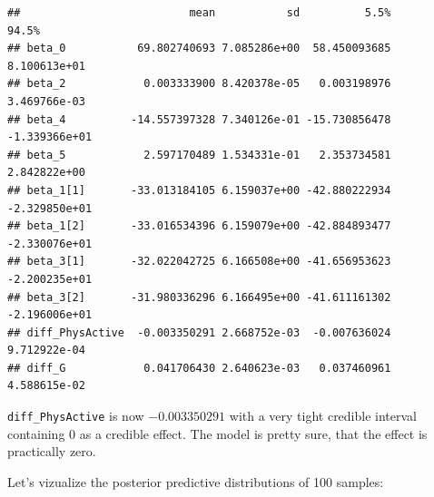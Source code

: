 \documentclass[
]{book}
\begin{document}
\begin{verbatim}
##                          mean           sd          5.5%         94.5%
## beta_0           69.802740693 7.085286e+00  58.450093685  8.100613e+01
## beta_2            0.003333900 8.420378e-05   0.003198976  3.469766e-03
## beta_4          -14.557397328 7.340126e-01 -15.730856478 -1.339366e+01
## beta_5            2.597170489 1.534331e-01   2.353734581  2.842822e+00
## beta_1[1]       -33.013184105 6.159037e+00 -42.880222934 -2.329850e+01
## beta_1[2]       -33.016534396 6.159079e+00 -42.884893477 -2.330076e+01
## beta_3[1]       -32.022042725 6.166508e+00 -41.656953623 -2.200235e+01
## beta_3[2]       -31.980336296 6.166495e+00 -41.611161302 -2.196006e+01
## diff_PhysActive  -0.003350291 2.668752e-03  -0.007636024  9.712922e-04
## diff_G            0.041706430 2.640623e-03   0.037460961  4.588615e-02
\end{verbatim}

\texttt{diff\_PhysActive} is now \(-0.003350291\) with a very tight credible interval
containing \(0\) as a credible effect. The model is pretty sure, that the effect
is practically zero.

Let's vizualize the posterior predictive distributions of 100 samples:
\end{document}
